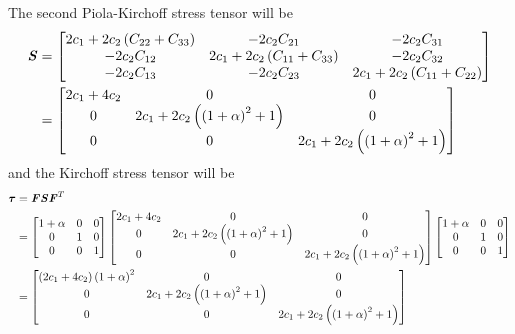 The second Piola-Kirchoff stress tensor will be
\begin{equation}
  \begin{split}
    \boldsymbol{\mathit{S}} &= \begin{bmatrix}
      2c_{1}+2c_{2}\left( C_{22}+C_{33} \right) & -2c_{2}C_{21} & -2c_{2}C_{31} \\
      -2c_{2}C_{12} & 2c_{1}+2c_{2}\left( C_{11}+C_{33} \right) & -2c_{2}C_{32} \\
      -2c_{2}C_{13} & -2c_{2}C_{23} & 2c_{1}+2c_{2}\left( C_{11}+C_{22} \right)
    \end{bmatrix} \\
    &= \begin{bmatrix}
      2c_{1}+4c_{2} & 0 & 0 \\
      0 & 2c_{1}+2c_{2}\left( \left( 1+\alpha \right)^2+1 \right) & 0 \\
      0 & 0 & 2c_{1}+2c_{2}\left( \left( 1+\alpha \right)^2+1 \right)
    \end{bmatrix}
  \end{split}
\end{equation}
and the Kirchoff stress tensor will be
\begin{equation}
  \begin{split}
    \boldsymbol{\mathit{\tau}}&=\boldsymbol{\mathit{F}}\boldsymbol{\mathit{S}}{\boldsymbol{\mathit{F}}}^{T} \\
    &= \begin{bmatrix}
      1+\alpha & 0 & 0 \\
      0 & 1 & 0 \\
      0 & 0 & 1
    \end{bmatrix} \begin{bmatrix}
      2c_{1}+4c_{2} & 0 & 0 \\
      0 & 2c_{1}+2c_{2}\left( \left( 1+\alpha \right)^2+1 \right) & 0 \\
      0 & 0 & 2c_{1}+2c_{2}\left( \left( 1+\alpha \right)^2+1 \right)
    \end{bmatrix}\begin{bmatrix}
      1+\alpha & 0 & 0 \\
      0 & 1 & 0 \\
      0 & 0 & 1
    \end{bmatrix} \\
    &= \begin{bmatrix}
      \left( 2c_{1}+4c_{2} \right)\left( 1+\alpha \right)^2 & 0 & 0 \\
      0 & 2c_{1}+2c_{2}\left( \left( 1+\alpha \right)^2+1 \right) & 0 \\
      0 & 0 & 2c_{1}+2c_{2}\left( \left( 1+\alpha \right)^2+1 \right)
    \end{bmatrix}
  \end{split}  
\end{equation}

